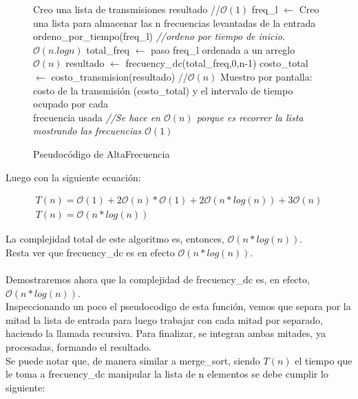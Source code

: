 \begin{figure}[!ht]
\begin{codebox}
\li Creo una lista de transmisiones resultado  //$\mathcal{O}(1)$ 
\li freq_l $\leftarrow$ Creo una lista para almacenar las n frecuencias levantadas de la entrada
\li ordeno_por_tiempo(freq_l) {\it //ordeno por tiempo de inicio. $\mathcal{O}(n.logn)$}
\li total_freq $\leftarrow$ paso freq_l ordenada a un arreglo $\mathcal{O}(n)$
\li resultado $\leftarrow$ frecuency_dc(total_freq,0,n-1)
\li costo_total $\leftarrow$ costo_transmision(resultado) //$\mathcal{O}(n)$
\li Muestro por pantalla: costo de la transmisión (costo_total) y el intervalo de tiempo ocupado por cada\\ frecuencia usada {\it //Se hace en $\mathcal{O}(n)$ porque es recorrer la lista mostrando las frecuencias $\mathcal{O}(1)$}
\end{codebox}
\caption{Pseudocódigo de AltaFrecuencia}\label{code:altafrec}
\end{figure}
\FloatBarrier

Luego con la siguiente ecuación:

\begin{equation*}
\begin{array}{l}
T(n) = \mathcal{O}(1) + 2\mathcal{O}(n)*\mathcal{O}(1) + 2\mathcal{O}(n*log(n)) + 3\mathcal{O}(n)\\
T(n) = \mathcal{O}(n*log(n))
\end{array}
\end{equation*}

La complejidad total de este algoritmo es, entonces, $\mathcal{O}(n*log(n))$.
\\
Resta ver que frecuency_dc es en efecto $\mathcal{O}(n*log(n))$.
\\
\\
Demostraremos ahora que la complejidad de frecuency_dc es, en efecto, $\mathcal{O}(n*log(n))$.\\
Inspeccionando un poco el pseudocodigo de esta función, vemos que separa por la mitad la lista de entrada para luego trabajar con cada mitad por separado, haciendo la llamada recursiva. Para finalizar, se integran ambas mitades, ya procesadas, formando el resultado.\\
Se puede notar que, de manera similar a merge_sort, siendo $T(n)$ el tiempo que le toma a frecuency_dc manipular la lista de n elementos se debe cumplir lo siguiente:

